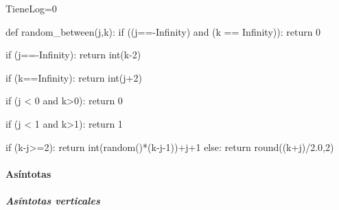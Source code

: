 \begin{sagesilent}
TieneLog=0
\end{sagesilent}
\begin{sagesilent}
def random_between(j,k):
 if ((j==-Infinity) and (k == Infinity)):
  return 0

 if (j==-Infinity):
  return int(k-2)

 if (k==Infinity):
  return int(j+2)

 if (j < 0 and k>0):
  return 0

 if (j < 1 and k>1):
  return 1


 if (k-j>=2):
  return int(random()*(k-j-1))+j+1
 else:
  return round((k+j)/2.0,2)
\end{sagesilent}


\paragraph{Asíntotas}
\subparagraph{Asíntotas verticales}

